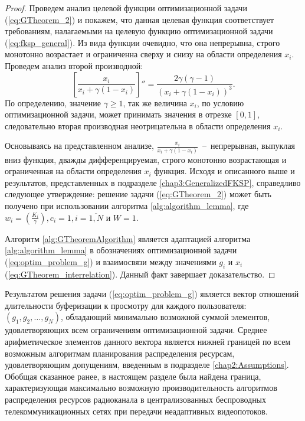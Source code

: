 \begin{proof}
Проведем анализ целевой функции оптимизационной задачи (\ref{eq:GTheorem_2}) и покажем, что данная целевая функция соответствует требованиям, налагаемыми на целевую функцию оптимизационной задачи (\ref{eq:fksp_general}). Из вида функции очевидно, что она непрерывна, строго монотонно возрастает и ограниченна сверху и снизу на области определения $x_i$. Проведем анализ второй производной:
$$\left[\frac{x_i}{x_i + \gamma (1-x_i)}\right]'' = \frac{2\gamma(\gamma - 1)}{(x_i + \gamma(1 - x_i))^3}.$$
По определению, значение $\gamma \geq 1$, так же величина $x_i$, по условию оптимизационной задачи, может принимать значения в отрезке $[0,1]$, следовательно вторая производная неотрицательна в области определения $x_i$.

Основываясь на представленном анализе, $\frac{x_i}{x_i + \gamma (1-x_i)}$~--~непрерывная, выпуклая вниз функция, дважды дифференцируемая, строго монотонно возрастающая и ограниченная на области определения $x_i$ функция. Исходя и описанного выше и результатов, представленных в подразделе \ref{chap3:GeneralizedFKSP}, справедливо следующее утверждение: решение задачи (\ref{eq:GTheorem_2}) может быть получено при использовании алгоритма \ref{alg:algorithm_lemma}, где $w_i = \left(\frac{K_i}{\gamma}\right), c_i = 1, i=\overline{1,N}$ и $W = 1$.

Алгоритм \ref{alg:GTheoremAlgorithm} является адаптацией алгоритма \ref{alg:algorithm_lemma} в обозначениях оптимизационной задачи (\ref{eq:optim_problem_g}) и взаимосвязи между значениями $g_i$ и $x_i$ (\ref{eq:GTheorem_interrelation}). Данный факт завершает доказательство.
\end{proof}

Результатом решения задачи (\ref{eq:optim_problem_g}) является вектор отношений длительности буферизации к просмотру для каждого пользователя: $(g_1, g_2, \ldots, g_N)$, обладающий минимально возможной суммой элементов, удовлетворяющих всем ограничениям оптимизационной задачи. Среднее арифметическое элементов данного вектора является нижней границей по всем возможным алгоритмам планирования распределения ресурсам, удовлетворяющим допущениям, введенным в подразделе \ref{chap2:Assumptions}. Обобщая сказанное ранее, в настоящем разделе была найдена граница, характеризующая максимально возможную производительность алгоритмов распределения ресурсов радиоканала в централизованных беспроводных телекоммуникационных сетях при передачи неадаптивных видеопотоков.

